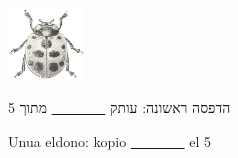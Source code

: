 \begin{titlepage}
\begin{center}
	\includegraphics[width=2.0cm]{"puŝiŝit.png"}
\end{center}

\apartigilo

\dulingvaujo
{
	\begin{center}
		הדפסה ראשונה: עותק \underline{~ ~ ~ ~ ~} מתוך 5
	\end{center}
}
{
	\begin{center}
		Unua eldono: kopio \underline{~ ~ ~ ~ ~} el 5
	\end{center}
}

\end{titlepage}
